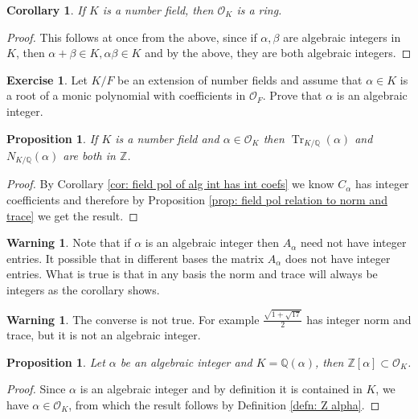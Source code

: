 \documentclass[11pt,a4paper]{report}
\theoremstyle{plain}
\newtheorem{cor}[subsection]{Corollary}
\newtheorem{prop}[subsection]{Proposition}
\theoremstyle{definition}
\theoremstyle{definition}
\newtheorem{warn}[subsection]{Warning}
\newtheorem{question}[subsection]{Exercise}
\newcommand{\Tr}{\operatorname{Tr}}
\newcommand{\ZZ}{\mathbb{Z}}
\def\QQ{\mathbb{Q}}
\def \a{\alpha}
\def \OO {\mathcal{O}}
\begin{document}
	\begin{cor}
		If $K$ is a number field, then $\OO_K$ is a ring.
	\end{cor}
	
	\begin{proof}
		This follows at once from the above, since if $\a,\beta$ are algebraic integers in $K$, then $\a+\beta \in K, \a \beta \in K$ and by the above, they are both algebraic integers.
	\end{proof}
	
	\begin{question}\label{quest: ints in tower law}
		Let $K/F$ be an extension of number fields and assume that $\a \in K$ is a root of a monic polynomial with coefficients in $\OO_F$. Prove that $\a$ is an algebraic integer.
	\end{question}
	
	\begin{prop}\label{prop: norm trace of alg int is int}
		If $K$ is a number field and $\a \in \OO_K$ then $\Tr_{K/\QQ}(\a)$ and $N_{K/\QQ}(\a)$ are both in $\ZZ$. 
	\end{prop}
	
	\begin{proof}
		By Corollary \ref{cor: field pol of alg int has int coefs} we know $C_\a$ has integer coefficients and therefore by Proposition \ref{prop: field pol relation to norm and trace} we get the result.
		
		
	\end{proof}
	
	
	\begin{warn}
		Note  that if $\a$ is an algebraic integer then $A_\a$ need not have  integer entries. It possible that in different bases the matrix $A_\a$ does not have integer entries. What is true is that in any basis the norm and trace will always be integers as the corollary shows.
	\end{warn}
	
	
	\begin{warn}
		The converse is not true. For example $\frac{\sqrt{1+\sqrt{17}}}{2}$ has integer norm and trace, but it is not an algebraic integer. 
	\end{warn}
	
	
	
	
	\begin{prop}
		Let $\a$ be an algebraic integer and $K=\QQ(\a)$, then $\ZZ[\a] \subset \OO_K$.
	\end{prop}
	
	\begin{proof}
		Since $\a$ is an algebraic integer and by definition it is contained in $K$, we have $\a \in \OO_K$, from which the result follows by Definition \ref{defn: Z alpha}.
	\end{proof}
	
\end{document}
